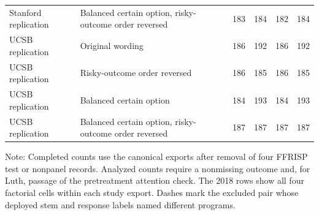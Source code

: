 \begin{table}[H]
\begin{threeparttable}
\begin{tabular}[t]{llrrrr}
Stanford replication & Balanced certain option, risky-outcome order reversed & 183 & 184 & 182 & 184\\
UCSB replication & Original wording & 186 & 192 & 186 & 192\\
UCSB replication & Risky-outcome order reversed & 186 & 185 & 186 & 185\\
UCSB replication & Balanced certain option & 184 & 193 & 184 & 193\\
UCSB replication & Balanced certain option, risky-outcome order reversed & 187 & 187 & 187 & 187\\
\bottomrule
\end{tabular}
\begin{tablenotes}[para]
\item Note: Completed counts use the canonical exports after removal of four FFRISP test or nonpanel records. Analyzed counts require a nonmissing outcome and, for Luth, passage of the pretreatment attention check. The 2018 rows show all four factorial cells within each study export. Dashes mark the excluded pair whose deployed stem and response labels named different programs.
\end{tablenotes}
\end{threeparttable}
\end{table}

